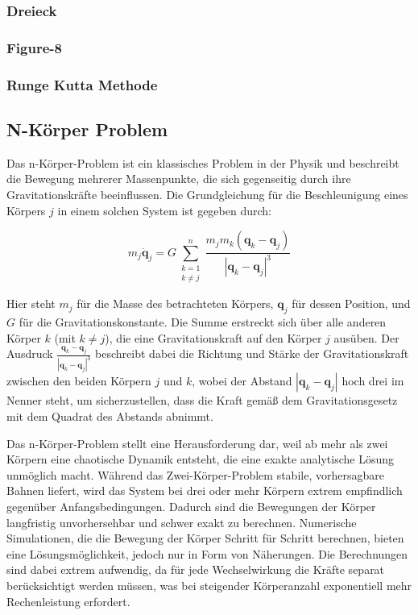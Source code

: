 \documentclass[a4paper,12pt,twoside]{article}
\begin{document}
\subsubsection{Dreieck}
\subsubsection{Figure-8}
\subsubsection{Runge Kutta Methode}


\subsection{N-Körper Problem}
Das n-Körper-Problem ist ein klassisches Problem in der Physik und beschreibt die Bewegung mehrerer Massenpunkte, die sich gegenseitig durch ihre Gravitationskräfte beeinflussen. Die Grundgleichung für die Beschleunigung eines Körpers \( j \) in einem solchen System ist gegeben durch:

\[
m_j \ddot{\mathbf{q}}_j = G \sum_{\substack{k=1 \\ k \neq j}}^n \frac{m_j m_k (\mathbf{q}_k - \mathbf{q}_j)}{|\mathbf{q}_k - \mathbf{q}_j|^3}
\]

Hier steht \( m_j \) für die Masse des betrachteten Körpers, \( \mathbf{q}_j \) für dessen Position, und \( G \) für die Gravitationskonstante. Die Summe erstreckt sich über alle anderen Körper \( k \) (mit \( k \neq j \)), die eine Gravitationskraft auf den Körper \( j \) ausüben. Der Ausdruck \( \frac{\mathbf{q}_k - \mathbf{q}_j}{|\mathbf{q}_k - \mathbf{q}_j|^3} \) beschreibt dabei die Richtung und Stärke der Gravitationskraft zwischen den beiden Körpern \( j \) und \( k \), wobei der Abstand \( |\mathbf{q}_k - \mathbf{q}_j| \) hoch drei im Nenner steht, um sicherzustellen, dass die Kraft gemäß dem Gravitationsgesetz mit dem Quadrat des Abstands abnimmt.

Das n-Körper-Problem stellt eine Herausforderung dar, weil ab mehr als zwei Körpern eine chaotische Dynamik entsteht, die eine exakte analytische Lösung unmöglich macht. Während das Zwei-Körper-Problem stabile, vorhersagbare Bahnen liefert, wird das System bei drei oder mehr Körpern extrem empfindlich gegenüber Anfangsbedingungen.
Dadurch sind die Bewegungen der Körper langfristig unvorhersehbar und schwer exakt zu berechnen. Numerische Simulationen, die die Bewegung der Körper Schritt für Schritt berechnen, bieten eine Lösungsmöglichkeit, jedoch nur in Form von Näherungen. Die Berechnungen sind dabei extrem aufwendig, da für jede Wechselwirkung die Kräfte separat berücksichtigt werden müssen, was bei steigender Körperanzahl exponentiell mehr Rechenleistung erfordert.
\end{document}
